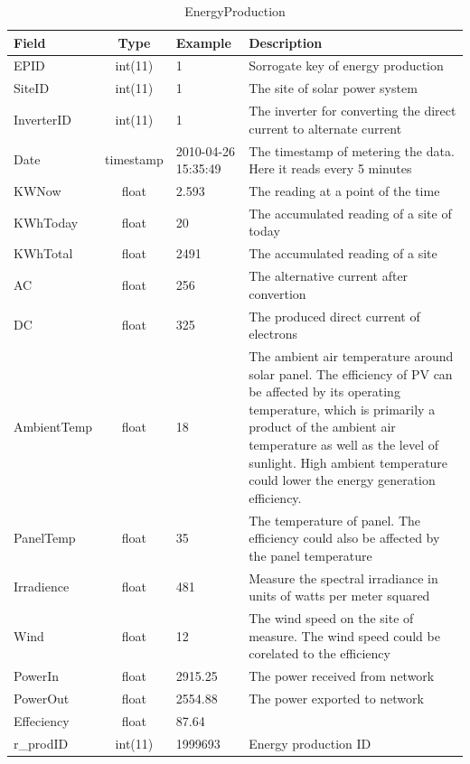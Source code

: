 \documentclass[a4paper,12pt]{llncs}
\begin{document}
\begin{table}[htp]
\centering
\caption{EnergyProduction}
\begin{tabular}{|l|c|l|p{8.5cm}|}
 \hline
 {\bf Field}       & {\bf Type} & {\bf Example}     & {\bf Description } \\ \hline
 EPID        & int(11)   &1 & Sorrogate key of energy production \\ \hline
 SiteID      & int(11)   &1 &  The site of solar power system\\  \hline
 InverterID  & int(11)   &1 &  The inverter for converting the direct current to alternate current\\ \hline
 Date        & timestamp &2010-04-26 15:35:49 & The timestamp of metering the data. Here it reads every 5 minutes \\ \hline
 KWNow       & float     & 2.593& The reading at a point of the time  \\ \hline
 KWhToday    & float     & 20& The accumulated reading of a site of today \\  \hline
 KWhTotal    & float     &2491 & The accumulated reading of a site  \\ \hline
 AC          & float     & 256&  The alternative current after convertion \\ \hline
 DC          & float     &325 & The produced direct current of  electrons\\ \hline
 AmbientTemp & float     &18 &  The ambient air temperature around solar panel. The efficiency of PV can be affected by its operating temperature, which is primarily a product of the ambient air temperature as well as the level of sunlight. High ambient temperature could lower the energy generation efficiency.  \\ \hline
 PanelTemp   & float     &35 & The temperature of panel. The efficiency could also be affected by the panel temperature \\ \hline
 Irradience  & float     &481 & Measure the spectral irradiance in units of watts per meter squared \\ \hline
 Wind        & float     &12 & The wind speed on the site of measure. The wind speed could be corelated to the efficiency  \\ \hline
 PowerIn     & float     &2915.25 & The power received from network\\ \hline
 PowerOut    & float     &2554.88 & The power exported to network \\ \hline
 Effeciency  & float     &87.64 & \\ \hline
 r\_prodID   & int(11)   &1999693 & Energy production ID\\ \hline
\end{tabular}
\end{table}
\end{document}
